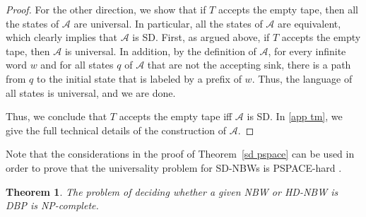 \documentclass[10pt,a4paper]{amsart}
\newtheorem{thm}{Theorem}[section]
\theoremstyle{definition}
\numberwithin{equation}{section}
\newcommand{\A}{{\mathcal A}}
\begin{document}
\begin{proof}
For the other direction, we show that if $T$ accepts the empty tape, then all the states of $\A$ are universal. In particular, all the states of $\A$ are equivalent, which clearly implies that $\A$ is SD. First, as argued above, if $T$ accepts the empty tape, then $\A$ is universal. In addition, by the definition of $\A$, for every infinite word $w$ and for all states $q$ of $\A$ that are not the accepting sink, there is a path from $q$ to the initial state that is labeled by a prefix of $w$. Thus, the language of all states is universal, and we are done.


Thus, we conclude that $T$ accepts the empty tape iff $\A$ is SD.
In \autoref{app tm}, we give the full technical details of the construction of $\A$.
\end{proof}

Note that the considerations in the proof of Theorem~\ref{sd pspace} can be used in order to prove that the universality problem for SD-NBWs is PSPACE-hard \cite{AK23}.



 \begin{thm}\label{NPC Buchi DBP}
	The problem of deciding whether a given NBW or HD-NBW is DBP is NP-complete.
\end{thm}
\end{document}
